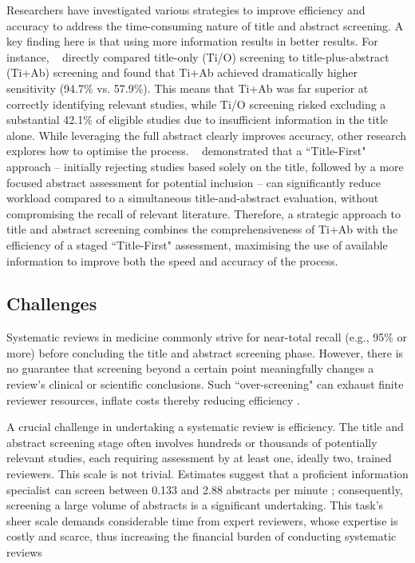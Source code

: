 \documentclass[10pt,oneside]{book}
\begin{document}
Researchers have investigated various strategies to improve efficiency and accuracy to address the time-consuming nature of title and abstract screening. A key finding here is that using more information results in better results. For instance, ~\cite{teo_title-plus-abstract_2023} directly compared title-only (Ti/O) screening to title-plus-abstract (Ti+Ab) screening and found that Ti+Ab achieved dramatically higher sensitivity (94.7\% vs. 57.9\%). This means that Ti+Ab was far superior at correctly identifying relevant studies, while Ti/O screening risked excluding a substantial 42.1\% of eligible studies due to insufficient information in the title alone. While leveraging the full abstract clearly improves accuracy, other research explores how to optimise the process. ~\cite{mateen_titles_2013} demonstrated that a ``Title-First" approach – initially rejecting studies based solely on the title, followed by a more focused abstract assessment for potential inclusion – can significantly reduce workload compared to a simultaneous title-and-abstract evaluation, without compromising the recall of relevant literature. Therefore, a strategic approach to title and abstract screening combines the comprehensiveness of Ti+Ab with the efficiency of a staged ``Title-First" assessment, maximising the use of available information to improve both the speed and accuracy of the process.

\subsection{Challenges}

Systematic reviews in medicine commonly strive for near-total recall (e.g., 95\% or more) before concluding the title and abstract screening phase. However, there is no guarantee that screening beyond a certain point meaningfully changes a review's clinical or scientific conclusions. Such ``over-screening" can exhaust finite reviewer resources, inflate costs 
thereby reducing efficiency \cite{prabha_what_2007, ilani_analysis_2024}. 

A crucial challenge in undertaking a systematic review is efficiency. The title and abstract screening stage often involves hundreds or thousands of potentially relevant studies, each requiring assessment by at least one, ideally two, trained reviewers. This scale is not trivial. Estimates suggest that a proficient information specialist can screen between 0.133 and 2.88 abstracts per minute \cite{shemilt_use_2016,giummarra_evaluation_2020,felizardo_visual_2013}; consequently, screening a large volume of abstracts is a significant undertaking. This task's sheer scale demands considerable time from expert reviewers, whose expertise is costly and scarce, thus increasing the financial burden of conducting systematic reviews
\end{document}
